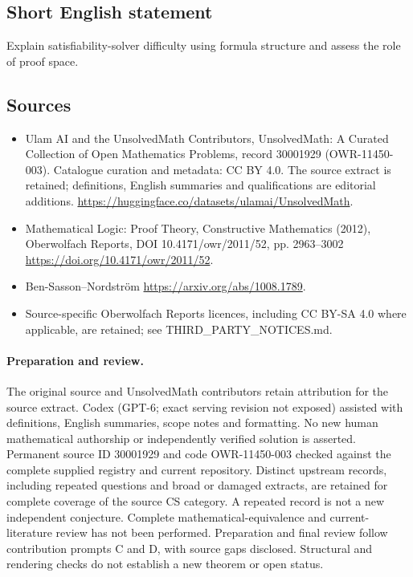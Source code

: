 \documentclass[11pt]{article}
\begin{document}
\subsection{Short English statement}
Explain satisfiability-solver difficulty using formula structure and assess the role of proof space.
\subsection{Sources}
\begin{itemize}
\item[\hypertarget{source:30001929:1}{S1}] Ulam AI and the UnsolvedMath Contributors, UnsolvedMath: A Curated Collection of Open Mathematics Problems, record 30001929 (OWR-11450-003). Catalogue curation and metadata: CC BY 4.0. The source extract is retained; definitions, English summaries and qualifications are editorial additions.
\url{https://huggingface.co/datasets/ulamai/UnsolvedMath}.
\item[\hypertarget{source:30001929:2}{S2}] Mathematical Logic: Proof Theory, Constructive Mathematics (2012), Oberwolfach Reports, DOI 10.4171/owr/2011/52, pp. 2963--3002
\url{https://doi.org/10.4171/owr/2011/52}.
\item[\hypertarget{source:30001929:3}{S3}] Ben-Sasson--Nordström
\url{https://arxiv.org/abs/1008.1789}.
\item Source-specific Oberwolfach Reports licences, including CC BY-SA 4.0 where applicable, are retained; see THIRD\_PARTY\_NOTICES.md.
\end{itemize}
\paragraph{Preparation and review.}
The original source and UnsolvedMath contributors retain attribution for the source extract. Codex (GPT-6; exact serving revision not exposed) assisted with definitions, English summaries, scope notes and formatting. No new human mathematical authorship or independently verified solution is asserted. Permanent source ID 30001929 and code OWR-11450-003 checked against the complete supplied registry and current repository. Distinct upstream records, including repeated questions and broad or damaged extracts, are retained for complete coverage of the source CS category. A repeated record is not a new independent conjecture. Complete mathematical-equivalence and current-literature review has not been performed. Preparation and final review follow contribution prompts C and D, with source gaps disclosed. Structural and rendering checks do not establish a new theorem or open status.
\label{end:30001929}
\end{document}
